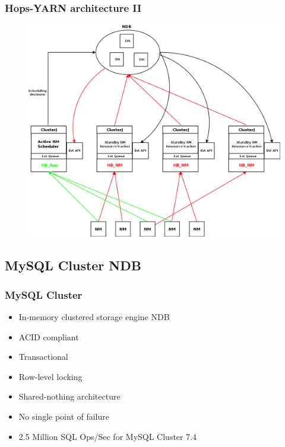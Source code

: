 \documentclass{beamer}
\begin{document}
\begin{frame}
\frametitle{Hops-YARN architecture II}

\begin{figure}
\centering
\includegraphics[scale=0.17]{resources/hopsyarn_arch_components.png}
\end{figure}
\end{frame}

\subsection{MySQL Cluster NDB}
\begin{frame}
\frametitle{MySQL Cluster}
\begin{itemize}
\item In-memory clustered storage engine NDB
\item ACID compliant
\item Transactional
\item Row-level locking
\item Shared-nothing architecture
\item No single point of failure
\item 2.5 Million SQL Ops/Sec for MySQL Cluster 7.4
\end{itemize}
\end{frame}
\end{document}
